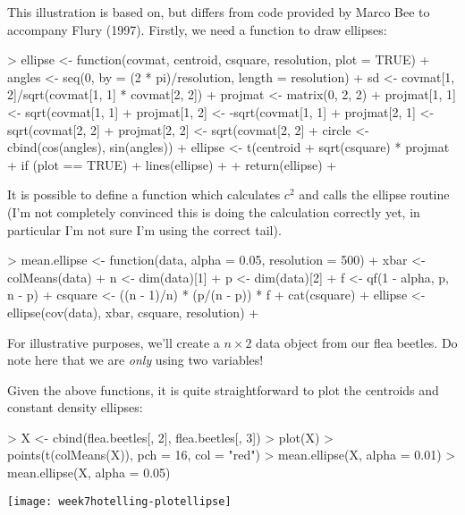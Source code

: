 This illustration is based on, but differs from code provided by Marco Bee to accompany Flury (1997).   Firstly, we need a function to draw ellipses:

\begin{Schunk}
\begin{Sinput}
> ellipse <- function(covmat, centroid, csquare, resolution, plot = TRUE) {
+     angles <- seq(0, by = (2 * pi)/resolution, length = resolution)
+     sd <- covmat[1, 2]/sqrt(covmat[1, 1] * covmat[2, 2])
+     projmat <- matrix(0, 2, 2)
+     projmat[1, 1] <- sqrt(covmat[1, 1] %*% (1 + sd)/2)
+     projmat[1, 2] <- -sqrt(covmat[1, 1] %*% (1 - sd)/2)
+     projmat[2, 1] <- sqrt(covmat[2, 2] %*% (1 + sd)/2)
+     projmat[2, 2] <- sqrt(covmat[2, 2] %*% (1 - sd)/2)
+     circle <- cbind(cos(angles), sin(angles))
+     ellipse <- t(centroid + sqrt(csquare) * projmat %*% t(circle))
+     if (plot == TRUE) {
+         lines(ellipse)
+     }
+     return(ellipse)
+ }
\end{Sinput}
\end{Schunk}

It is possible to define a function which calculates $c^{2}$ and calls the ellipse routine (I'm not completely convinced this is doing the calculation correctly yet, in particular I'm not sure I'm using the correct tail).

\begin{Schunk}
\begin{Sinput}
> mean.ellipse <- function(data, alpha = 0.05, resolution = 500) {
+     xbar <- colMeans(data)
+     n <- dim(data)[1]
+     p <- dim(data)[2]
+     f <- qf(1 - alpha, p, n - p)
+     csquare <- ((n - 1)/n) * (p/(n - p)) * f
+     cat(csquare)
+     ellipse <- ellipse(cov(data), xbar, csquare, resolution)
+ }
\end{Sinput}
\end{Schunk}




For illustrative purposes, we'll create a $n \times 2$ data object from our flea beetles.   Do note here that we are \emph{only} using two variables!



Given the above functions, it is quite straightforward to plot the centroids and constant density ellipses:

\begin{Schunk}
\begin{Sinput}
> X <- cbind(flea.beetles[, 2], flea.beetles[, 3])
> plot(X)
> points(t(colMeans(X)), pch = 16, col = "red")
> mean.ellipse(X, alpha = 0.01)
> mean.ellipse(X, alpha = 0.05)
\end{Sinput}
\end{Schunk}
\texttt{[image: week7hotelling-plotellipse]}

